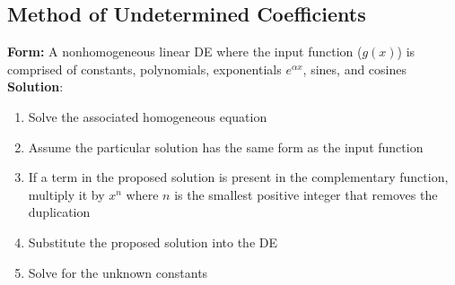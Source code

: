 \documentclass{article}
\begin{document}
\subsection{Method of Undetermined Coefficients}

\textbf{Form:} A nonhomogeneous linear DE where the input function ($g(x)$) is comprised of constants, polynomials, exponentials $e^{\alpha x}$, sines, and cosines \\ \textbf{Solution}: \begin{enumerate}
  \item Solve the associated homogeneous equation

  \item Assume the particular solution has the same form as the input function

  \item If a term in the proposed solution is present in the complementary function, multiply it by $x^n$ where $n$ is the smallest positive integer that removes the duplication

  \item Substitute the proposed solution into the DE

  \item Solve for the unknown constants
\end{enumerate}
\end{document}
